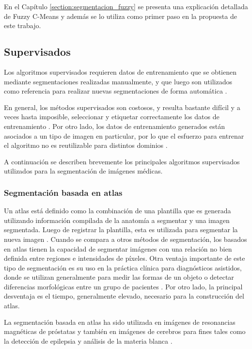 En el Capítulo \ref{section:segmentacion_fuzzy} se presenta una explicación detallada de Fuzzy C-Means y además se lo utiliza como primer paso en la propuesta de este trabajo.

\subsection{Supervisados}
Los algoritmos supervisados requieren datos de entrenamiento que se obtienen mediante segmentaciones realizadas manualmente, y que luego son utilizados como referencia para realizar nuevas segmentaciones de forma automática \citep{pham2000current}.

En general, los métodos supervisados son costosos, y resulta bastante difícil y a veces hasta imposible, seleccionar y etiquetar correctamente los datos de entrenamiento \citep{jain2000statistical}. Por otro lado, los datos de entrenamiento generados están asociados a un tipo de imagen en particular, por lo que el esfuerzo para entrenar el algoritmo no es reutilizable para distintos dominios \citep{sharma2010automated}.

A continuación se describen brevemente los principales algoritmos supervisados utilizados para la segmentación de imágenes médicas.

\subsubsection{Segmentación basada en atlas}
Un atlas está definido como la combinación de una plantilla que es generada utilizando información compilada de la anatomía a segmentar y una imagen segmentada. Luego de registrar la plantilla, esta es utilizada para segmentar la nueva imagen \citep{cabezas2011review}. Cuando se compara a otros métodos de segmentación, los basados en atlas tienen la capacidad de segmentar imágenes con una relación no bien definida entre regiones e intensidades de píxeles. Otra ventaja importante de este tipo de segmentación es su uso en la práctica clínica para diagnósticos asistidos, donde se utilizan generalmente para medir las formas de un objeto o detectar diferencias morfológicas entre un grupo de pacientes \citep{kalinic2009atlas}. Por otro lado, la principal desventaja es el tiempo, generalmente elevado, necesario para la construcción del atlas.
 
La segmentación basada en atlas ha sido utilizada en imágenes de resonancias magnéticas de próstatas \citep{gubern2009atlas, klein2007segmentation, martin2010automated} y también en imágenes de cerebros para fines tales como la detección de epilepsia \citep{nagsemi} y análisis de la materia blanca \citep{lawes2008atlas}.

